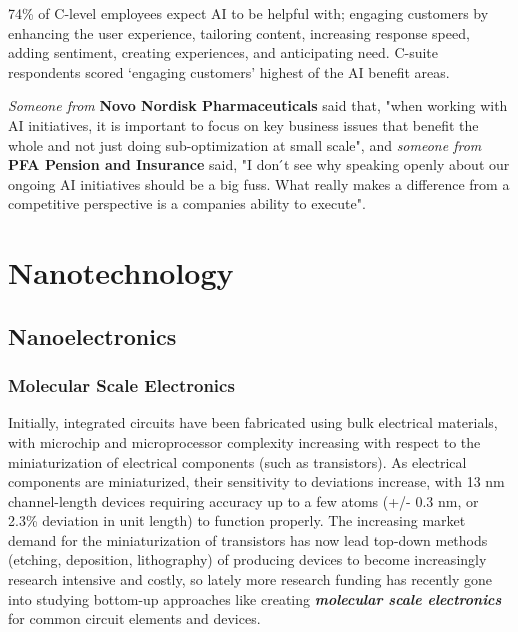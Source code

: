\documentclass{article}
\begin{document}
\hspace{-0.675cm} 74\% of C-level employees expect AI to be helpful with; engaging customers by enhancing the user experience, tailoring content, increasing response speed, adding sentiment, creating experiences, and anticipating need. C-suite respondents scored ‘engaging customers’ highest of the AI benefit areas.

\vspace{0.2cm}

\hspace{-0.675cm} \textit{Someone from} \textbf{Novo Nordisk Pharmaceuticals} said that, "when working with AI initiatives, it is important to focus on key business issues that benefit the whole and not just doing sub-optimization at small scale", and \textit{someone from} \textbf{PFA Pension and Insurance} said, "I don ́t see why speaking openly about our ongoing AI initiatives should be a big fuss. What really makes a difference from a competitive perspective is a companies ability to execute".

\newpage




\section{Nanotechnology}

\newpage

\subsection{Nanoelectronics} 

\subsubsection{Molecular Scale Electronics} 

Initially, integrated circuits have been fabricated using bulk electrical materials, with microchip and microprocessor complexity increasing with respect to the miniaturization of electrical components (such as transistors). As electrical components are miniaturized, their sensitivity to deviations increase, with 13 nm channel-length devices requiring accuracy up to a few atoms (+/- 0.3 nm, or 2.3\% deviation in unit length) to function properly. The increasing market demand for the miniaturization of transistors has now lead top-down methods (etching, deposition, lithography) of producing devices to become increasingly research intensive and costly, so lately more research funding has recently gone into studying bottom-up approaches like creating \textbf{\textit{molecular scale electronics}} for common circuit elements and devices. 
\end{document}
